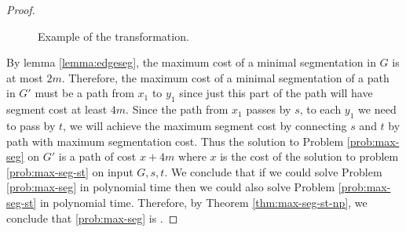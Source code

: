 \begin{proof}
\begin{figure}[H]
\begin{center}
\end{center}
\caption{Example of the transformation.}
\label{fig:np-transform2}
\end{figure}

By lemma \ref{lemma:edgeseg}, the maximum cost of a minimal segmentation in $G$ is at most $2 m$. Therefore,
the maximum cost of a minimal segmentation of a path in $G'$ must be a path from $x_1$ to $y_1$ since just this part
of the path will have segment cost at least $4m$. Since the path from $x_1$ passes by $s$, to each
$y_1$ we need to pass by $t$, we will achieve the maximum segment cost by connecting $s$ and $t$ by path with maximum 
segmentation cost. Thus the solution to Problem \ref{prob:max-seg} on $G'$ is a path of cost $x + 4m$ where $x$ is the cost of
the solution to problem \ref{prob:max-seg-st} on input $G, s, t$. We conclude that if we could solve Problem \ref{prob:max-seg}
in polynomial time then we could also solve Problem \ref{prob:max-seg-st} in polynomial time. Therefore, by Theorem \ref{thm:max-seg-st-np},
we conclude that \ref{prob:max-seg} is \NPhard.


\end{proof}




